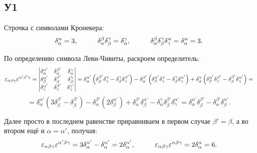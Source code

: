 \subsection*{У1}
Строчка с символами Кронекера:
\begin{equation*}
	\delta_{\alpha}^{\alpha} = 3,
	\hspace{0.5 cm}
	\hspace{0.5 cm}
	\delta_{\alpha}^{\beta} \delta_{\beta}^{\gamma} = \delta_{\alpha}^{\gamma},
	\hspace{1 cm}
	\delta_{\alpha}^{\beta} \delta_{\beta}^{\gamma} \delta_{\gamma}^{\alpha} =\delta_{\alpha}^{\alpha} = 3.
\end{equation*}

По определению символа Леви-Чивиты, раскроем определитель:
\begin{equation*}
	\varepsilon_{\alpha \beta \gamma} \varepsilon^{\alpha' \beta' \gamma} = 
	\begin{vmatrix}
	    \delta_\alpha^{\alpha'} & \delta_{\alpha}^{\beta'} & \delta_{\alpha}^{\gamma} \\
	    \delta_{\beta}^{\alpha'} & \delta_{\beta}^{\beta'} & \delta_{\beta}^{\gamma} \\
	    \delta_{\gamma}^{\alpha'} & \delta_{\gamma}^{\beta'} & \delta_{\gamma}^{\gamma`} \\
	\end{vmatrix}
	=
	\delta_{\alpha}^{\alpha'} \left(\delta_{\beta}^{\beta'} \delta_{\gamma}^{\gamma} - \delta_{\beta}^{\gamma} \delta_{\gamma}^{\beta'} \right)
	-
	\delta_{\alpha}^{\beta'} \left(\delta_{\beta}^{\alpha'} \delta_{\gamma}^{\gamma} -\delta_{\beta}^{\gamma} \delta_{\gamma}^{\alpha'} \right)
	+
	\delta_{\alpha}^{\gamma} \left(\delta_{\beta}^{\alpha'} \delta_{\gamma}^{\beta'} -\delta_{\beta}^{\beta'} \delta_{\gamma}^{\alpha'} \right)
	=
\end{equation*}
\begin{equation*}
	=\delta_{\alpha}^{\alpha'} \left(3 \delta_{\beta}^{\beta'}  - \delta_{\beta}^{\beta'} \right)
	-\delta_{\alpha}^{\beta'} \left(2 \delta_{\beta}^{\alpha'} \right) 
	+ \delta_{\alpha}^{\beta'} \delta_{\beta}^{\alpha'} 
	- \delta_{\alpha}^{\gamma} \delta_{\beta}^{\beta'} \delta_{\gamma}^{\alpha'}  
	=
	\boxed{
	\delta_{\alpha}^{\alpha'} \delta_{\beta}^{\beta'} - \delta_{\alpha}^{\beta'} \delta_{\beta}^{\alpha'}.
	}  
\end{equation*}

Далее просто в последнем равенстве приравниваем в первом случае $\beta' =\beta$, а во втором ещё и $\alpha=\alpha'$, получая:
\begin{equation*}
	\varepsilon_{\alpha \beta \gamma} \varepsilon^{\alpha' \beta \gamma} = 3 \delta_{\alpha}^{\alpha'} - \delta_{\alpha}^{\alpha'} = 2\delta_{\alpha}^{\alpha'},
	\hspace{0.5 cm}
	\hspace{0.5 cm}
	\varepsilon_{\alpha \beta \gamma} \varepsilon^{\alpha \beta \gamma} = 2 \delta_{\alpha}^{\alpha} = 6.
\end{equation*}
